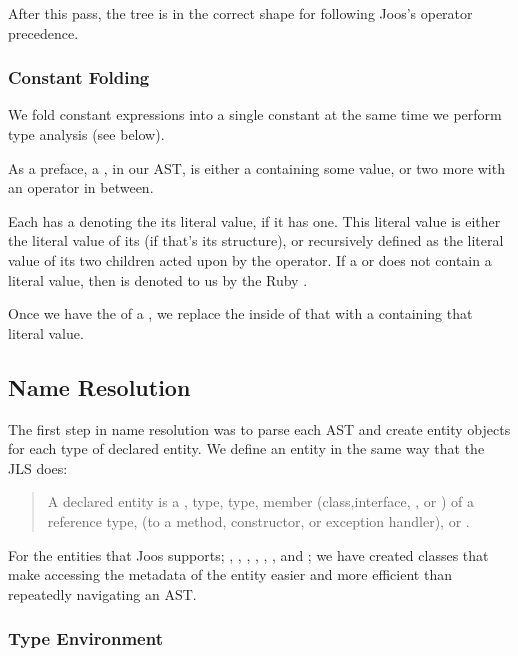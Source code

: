 \documentclass[pdftex,11pt,a4paper]{article}
\begin{document}
After this pass, the  tree is in the correct shape for
following Joos's operator precedence.

\subsubsection{Constant Folding}

We fold constant expressions into a single constant at the same time we perform
type analysis (see below).

As a preface, a , in our AST, is either a  containing some value, or two more  with an operator in
between.

Each  has a  denoting the its literal
value, if it has one. This literal value is either the literal value of its
 (if that's its structure), or recursively defined as the literal
value of its two  children acted upon by the operator. If
a  or  does not contain a literal value, then
 is denoted to us by the Ruby .

Once we have the  of a , we replace the
inside of that  with a  containing that literal
value.

\subsection{Name Resolution}

The first step in name resolution was to parse each AST and create
entity objects for each type of declared entity. We define an entity
in the same way that the JLS does:

\begin{quote}
A declared entity is a ,  type,
 type, member (class,interface, , or
) of a reference type,  (to a method,
constructor, or exception handler), or .
\end{quote}

For the entities that Joos supports; , ,
, , , , and
; we have created classes that make accessing the
metadata of the entity easier and more efficient than repeatedly
navigating an AST.


\subsubsection{Type Environment}
\end{document}
